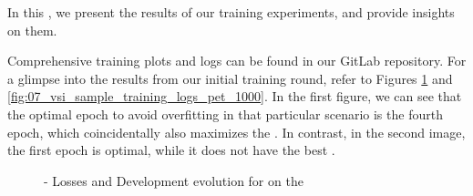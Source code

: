 

In this \headerName{}, we present the results of our training experiments, and provide insights on them.


Comprehensive training plots and logs can be found in our GitLab repository. For a glimpse into the results from our initial training round, refer to Figures \ref{fig:07_vsi_sample_training_logs_unbalanced} and \ref{fig:07_vsi_sample_training_logs_pet_1000}. 
In the first figure, we can see that the optimal epoch to avoid overfitting in that particular scenario is the fourth epoch, which coincidentally also maximizes the \fTwo{}. 
In contrast, in the second image, the first epoch is optimal, while it does not have the best \fTwo{}.



\begin{figure}[ht]
    \centering
    \hfill
    \hfill
    \caption{\unbalanced{} - Losses and Development \fTwo{} evolution for \bertmultilingual{} on the \trafilaturaTitle{}}
    \label{fig:07_vsi_sample_training_logs_unbalanced}
\end{figure}


